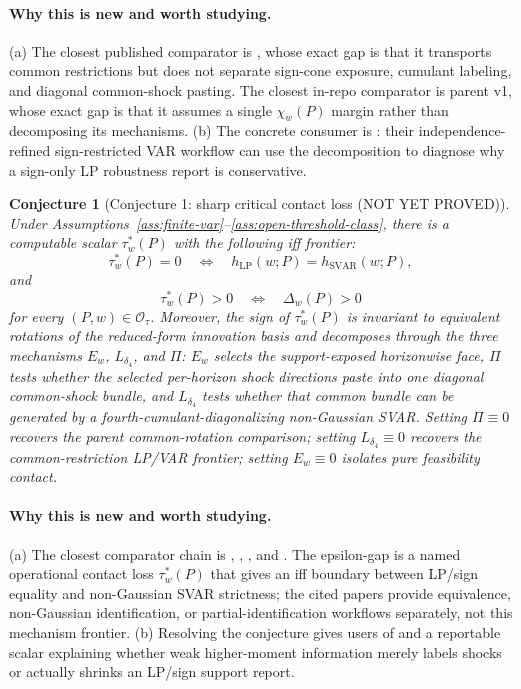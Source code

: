 \documentclass[11pt]{article}
\theoremstyle{definition}
\theoremstyle{plain}
\newtheorem{conjecture}{Conjecture}
\theoremstyle{remark}
\begin{document}
\paragraph{Why this is new and worth studying.}
(a) The closest published comparator is \citet[abstract and pp.~955--980]{PlagborgMollerWolf2021}, whose exact gap is that it transports common restrictions but does not separate sign-cone exposure, cumulant labeling, and diagonal common-shock pasting.  The closest in-repo comparator is parent v1, whose exact gap is that it assumes a single \(\chi_w(P)\) margin rather than decomposing its mechanisms.  (b) The concrete consumer is \citet[pp.~1827--1847]{DrautzburgWright2023}: their independence-refined sign-restricted VAR workflow can use the decomposition to diagnose why a sign-only LP robustness report is conservative.

\begin{conjecture}[Conjecture 1: sharp critical contact loss (NOT YET PROVED)]\label{conj:critical-threshold}
Under Assumptions~\ref{ass:finite-var}--\ref{ass:open-threshold-class}, there is a computable scalar \(\tau_w^*(P)\) with the following iff frontier:
\[
\tau_w^*(P)=0
\quad\Longleftrightarrow\quad
h_{\mathrm{LP}}(w;P)=h_{\mathrm{SVAR}}(w;P),
\]
and
\[
\tau_w^*(P)>0
\quad\Longleftrightarrow\quad
\Delta_w(P)>0
\]
for every \((P,w)\in\mathcal O_\tau\).  Moreover, the sign of \(\tau_w^*(P)\) is invariant to equivalent rotations of the reduced-form innovation basis and decomposes through the three mechanisms \(E_w\), \(L_{\delta_4}\), and \(\Pi\): \(E_w\) selects the support-exposed horizonwise face, \(\Pi\) tests whether the selected per-horizon shock directions paste into one diagonal common-shock bundle, and \(L_{\delta_4}\) tests whether that common bundle can be generated by a fourth-cumulant-diagonalizing non-Gaussian SVAR.  Setting \(\Pi\equiv0\) recovers the parent common-rotation comparison; setting \(L_{\delta_4}\equiv0\) recovers the common-restriction LP/VAR frontier; setting \(E_w\equiv0\) isolates pure feasibility contact.
\end{conjecture}
\paragraph{Why this is new and worth studying.}
(a) The closest comparator chain is \citet[abstract and pp.~955--980]{PlagborgMollerWolf2021}, \citet[pp.~288--304]{LanneMeitzSaikkonen2017}, \citet[pp.~1827--1847]{DrautzburgWright2023}, and \citet[abstract and pp.~1--3]{AnttonenLanneLuoto2024}.  The epsilon-gap is a named operational contact loss \(\tau_w^*(P)\) that gives an iff boundary between LP/sign equality and non-Gaussian SVAR strictness; the cited papers provide equivalence, non-Gaussian identification, or partial-identification workflows separately, not this mechanism frontier.  (b) Resolving the conjecture gives users of \citet{DrautzburgWright2023} and \citet{AnttonenLanneLuoto2024} a reportable scalar explaining whether weak higher-moment information merely labels shocks or actually shrinks an LP/sign support report.
\end{document}
